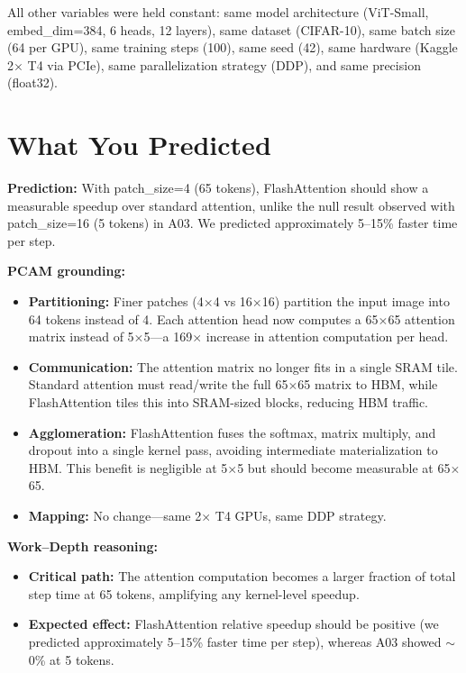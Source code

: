 \documentclass[12pt, a4paper]{article}
\begin{document}
All other variables were held constant: same model architecture (ViT-Small, embed\_dim=384, 6 heads, 12 layers), same dataset (CIFAR-10), same batch size (64 per GPU), same training steps (100), same seed (42), same hardware (Kaggle 2$\times$ T4 via PCIe), same parallelization strategy (DDP), and same precision (float32).

\section{What You Predicted}

\textbf{Prediction:} With patch\_size=4 (65 tokens), FlashAttention should show a measurable speedup over standard attention, unlike the null result observed with patch\_size=16 (5 tokens) in A03. We predicted approximately 5--15\% faster time per step.

\textbf{PCAM grounding:}
\begin{itemize}
    \item \textbf{Partitioning:} Finer patches (4$\times$4 vs 16$\times$16) partition the input image into 64 tokens instead of 4. Each attention head now computes a 65$\times$65 attention matrix instead of 5$\times$5---a 169$\times$ increase in attention computation per head.
    \item \textbf{Communication:} The attention matrix no longer fits in a single SRAM tile. Standard attention must read/write the full 65$\times$65 matrix to HBM, while FlashAttention tiles this into SRAM-sized blocks, reducing HBM traffic.
    \item \textbf{Agglomeration:} FlashAttention fuses the softmax, matrix multiply, and dropout into a single kernel pass, avoiding intermediate materialization to HBM. This benefit is negligible at 5$\times$5 but should become measurable at 65$\times$65.
    \item \textbf{Mapping:} No change---same 2$\times$ T4 GPUs, same DDP strategy.
\end{itemize}

\textbf{Work--Depth reasoning:}
\begin{itemize}
    \item \textbf{Critical path:} The attention computation becomes a larger fraction of total step time at 65 tokens, amplifying any kernel-level speedup.
    \item \textbf{Expected effect:} FlashAttention relative speedup should be positive (we predicted approximately 5--15\% faster time per step), whereas A03 showed $\sim$0\% at 5 tokens.
\end{itemize}
\end{document}
